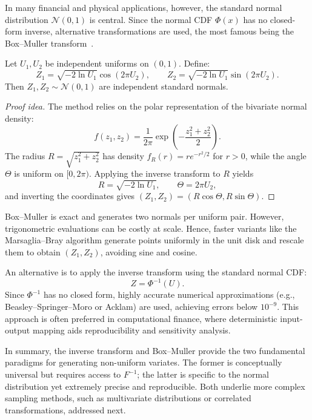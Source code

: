\bigskip
\noindent
In many financial and physical applications, however, the standard normal distribution \(\mathcal{N}(0,1)\) is central. 
Since the normal CDF \(\Phi(x)\) has no closed-form inverse, alternative transformations are used, the most famous being the Box--Muller transform~\cite{BoxMuller1958}.

\begin{definition}
Let \( U_1, U_2 \) be independent uniforms on \((0,1)\). 
Define:
\[
Z_1 = \sqrt{-2 \ln U_1}\cos(2\pi U_2), \qquad
Z_2 = \sqrt{-2 \ln U_1}\sin(2\pi U_2).
\]
Then \( Z_1, Z_2 \sim \mathcal{N}(0,1) \) are independent standard normals.
\end{definition}

\begin{proof}[Proof idea]
The method relies on the polar representation of the bivariate normal density:
\[
f(z_1, z_2) = \frac{1}{2\pi} \exp\!\left(-\frac{z_1^2 + z_2^2}{2}\right).
\]
The radius \( R = \sqrt{z_1^2 + z_2^2} \) has density \( f_R(r) = r e^{-r^2/2} \) for \( r > 0 \),
while the angle \(\Theta\) is uniform on \([0, 2\pi)\). 
Applying the inverse transform to \(R\) yields
\[
R = \sqrt{-2 \ln U_1}, \qquad \Theta = 2\pi U_2,
\]
and inverting the coordinates gives \( (Z_1, Z_2) = (R\cos\Theta, R\sin\Theta) \).
\end{proof}




\begin{remark}
Box--Muller is exact and generates two normals per uniform pair. 
However, trigonometric evaluations can be costly at scale. 
Hence, faster variants like the Marsaglia--Bray algorithm generate points uniformly in the unit disk and rescale them to obtain \( (Z_1, Z_2) \),
avoiding sine and cosine.
\end{remark}

\begin{remark}
An alternative is to apply the inverse transform using the standard normal CDF:
\[
Z = \Phi^{-1}(U).
\]
Since \(\Phi^{-1}\) has no closed form, highly accurate numerical approximations (e.g., Beasley--Springer--Moro or Acklam) are used,
achieving errors below \(10^{-9}\).
This approach is often preferred in computational finance, where deterministic input-output mapping 
aids reproducibility and sensitivity analysis.
\end{remark}

\bigskip
In summary, the inverse transform and Box--Muller provide the two fundamental paradigms 
for generating non-uniform variates. 
The former is conceptually universal but requires access to \(F^{-1}\);
the latter is specific to the normal distribution yet extremely precise and reproducible. 
Both underlie more complex sampling methods, such as multivariate distributions or correlated transformations, 
addressed next.
